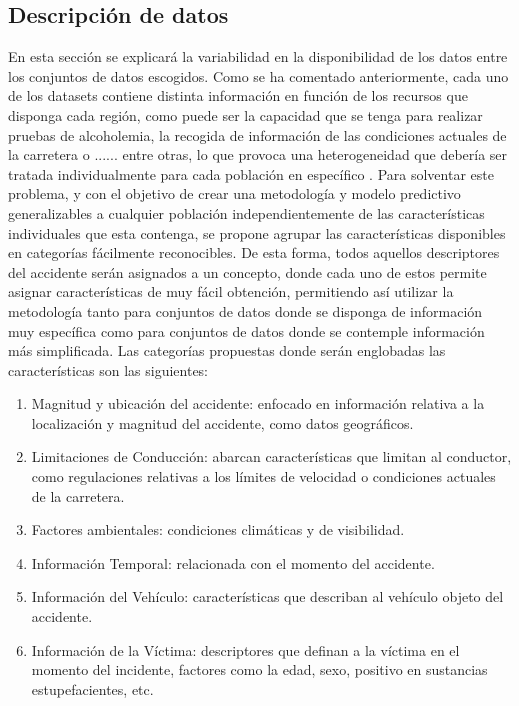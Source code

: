 \documentclass{uathesis-es}
\begin{document}
\subsection{Descripción de datos}

En esta sección se explicará la variabilidad en la disponibilidad de los datos entre los conjuntos de datos escogidos. Como se ha comentado anteriormente, cada uno de los datasets contiene distinta información en función de los recursos que disponga cada región, como puede ser la capacidad que se tenga para realizar pruebas de alcoholemia, la recogida de información de las condiciones actuales de la carretera o ...... entre otras, lo que provoca una heterogeneidad que debería ser tratada individualmente para cada población en específico . Para solventar este problema, y con el objetivo de crear una metodología y modelo predictivo generalizables a cualquier población independientemente de las características individuales que esta contenga, se propone agrupar las características disponibles en categorías fácilmente reconocibles. De esta forma, todos aquellos descriptores del accidente serán asignados a un concepto, donde cada uno de estos permite asignar características de muy fácil obtención, permitiendo así utilizar la metodología tanto para conjuntos de datos donde se disponga de información muy específica como para conjuntos de datos donde se contemple información más simplificada. Las categorías propuestas donde serán englobadas las características son las siguientes:

\begin{enumerate}
    \item Magnitud y ubicación del accidente: enfocado en información relativa a la localización y magnitud del accidente, como datos geográficos.
    \item Limitaciones de Conducción: abarcan características que limitan al conductor, como regulaciones relativas a los límites de velocidad o condiciones actuales de la carretera.
    \item Factores ambientales: condiciones climáticas y de visibilidad.
    \item Información Temporal: relacionada con el momento del accidente.
    \item Información del Vehículo: características que describan al vehículo objeto del accidente.
    \item Información de la Víctima: descriptores que definan a la víctima en el momento del incidente, factores como la edad, sexo, positivo en sustancias estupefacientes, etc.
\end{enumerate}
\end{document}
